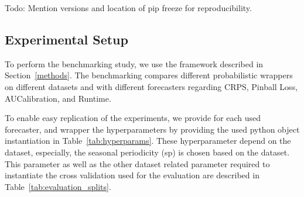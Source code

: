 Todo: Mention versions and location of pip freeze for reproducibility.

\subsection{Experimental Setup}
To perform the benchmarking study, we use the framework described in Section~\ref{methods}. The benchmarking compares different probabilistic wrappers on different datasets and with different forecasters regarding CRPS, Pinball Loss, AUCalibration, and Runtime. 

To enable easy replication of the experiments, we provide for each used forecaster, and wrapper the hyperparameters by providing the used python object instantiation in Table~\ref{tab:hyperparams}. These hyperparameter depend on the dataset, especially, the seasonal periodicity (sp) is chosen based on the dataset. This parameter as well as the other dataset related parameter required to instantiate the cross validation used for the evaluation are described in Table~\ref{tab:evaluation_splits}.


